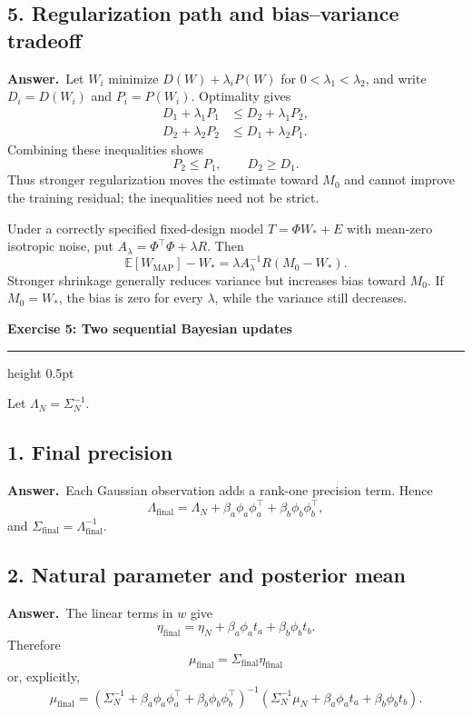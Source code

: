 \documentclass[11pt,a4paper]{article}
\newcommand{\exercise}[2]{%
  \Needspace{8\baselineskip}%
  \par\addvspace{1.1em}%
  {\Large\bfseries\color{examblue}Exercise #1: #2\par}%
  \nobreak\vspace{0.2em}%
  {\color{rulegray}\hrule height 0.5pt}%
  \vspace{0.55em}%
}
\newcommand{\answer}{\textbf{Answer.}\ }
\begin{document}
\subsection*{5. Regularization path and bias--variance tradeoff}

\answer Let $W_i$ minimize $D(W)+\lambda_iP(W)$ for $0<\lambda_1<\lambda_2$, and write $D_i=D(W_i)$ and $P_i=P(W_i)$. Optimality gives
\begin{align*}
  D_1+\lambda_1P_1&\leq D_2+\lambda_1P_2,\\
  D_2+\lambda_2P_2&\leq D_1+\lambda_2P_1.
\end{align*}
Combining these inequalities shows
\[
  \boxed{P_2\leq P_1},
  \qquad
  \boxed{D_2\geq D_1}.
\]
Thus stronger regularization moves the estimate toward $M_0$ and cannot improve the training residual; the inequalities need not be strict.

Under a correctly specified fixed-design model $T=\Phi W_*+E$ with mean-zero isotropic noise, put $A_\lambda=\Phi^\top\Phi+\lambda R$. Then
\[
  \mathbb{E}[W_{\mathrm{MAP}}]-W_*
  =\lambda A_\lambda^{-1}R(M_0-W_*).
\]
Stronger shrinkage generally reduces variance but increases bias toward $M_0$. If $M_0=W_*$, the bias is zero for every $\lambda$, while the variance still decreases.

\exercise{5}{Two sequential Bayesian updates}

Let $\Lambda_N=\Sigma_N^{-1}$.

\subsection*{1. Final precision}

\answer Each Gaussian observation adds a rank-one precision term. Hence
\[
  \boxed{\Lambda_{\mathrm{final}}
  =\Lambda_N+\beta_a\phi_a\phi_a^\top
  +\beta_b\phi_b\phi_b^\top},
\]
and $\Sigma_{\mathrm{final}}=\Lambda_{\mathrm{final}}^{-1}$.

\subsection*{2. Natural parameter and posterior mean}

\answer The linear terms in $w$ give
\[
  \boxed{\eta_{\mathrm{final}}
  =\eta_N+\beta_a\phi_at_a+\beta_b\phi_bt_b}.
\]
Therefore
\[
  \boxed{\mu_{\mathrm{final}}
  =\Sigma_{\mathrm{final}}\eta_{\mathrm{final}}}
\]
or, explicitly,
\[
  \mu_{\mathrm{final}}
  =(\Sigma_N^{-1}+\beta_a\phi_a\phi_a^\top
  +\beta_b\phi_b\phi_b^\top)^{-1}
  (\Sigma_N^{-1}\mu_N+\beta_a\phi_at_a+\beta_b\phi_bt_b).
\]
\end{document}

